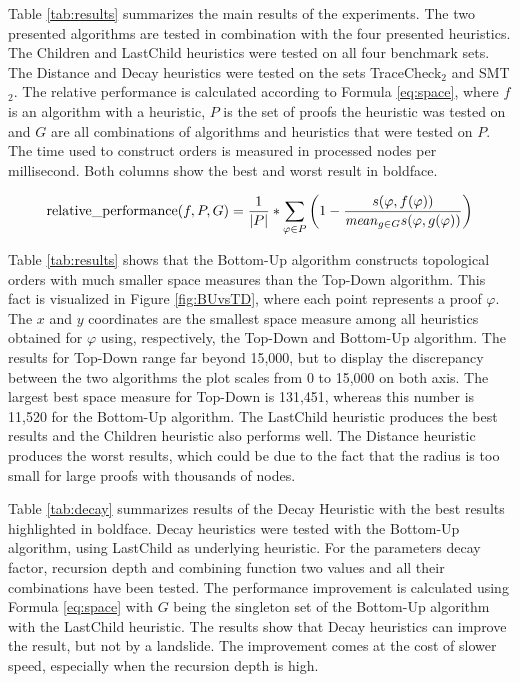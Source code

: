 Table \ref{tab:results} summarizes the main results of the experiments.
The two presented algorithms are tested in combination with the four presented heuristics.
The Children and LastChild heuristics were tested on all four benchmark sets.
The Distance and Decay heuristics were tested on the sets TraceCheck$_2$ and SMT$_2$.
The relative performance is calculated according to Formula \ref{eq:space}, where $f$ is an algorithm with a heuristic, $P$ is the set of proofs the heuristic was tested on and $G$ are all combinations of algorithms and heuristics that were tested on $P$.
The time used to construct orders is measured in processed nodes per millisecond.
Both columns show the best and worst result in boldface.

\begin{align}
  \operatorname{relative\_performance}(f,P,G) = \frac{1}{|P|} * \sum_{\varphi \in P}{\left( 1 -
    \frac{
      s(\varphi,f(\varphi))
    }{
        \mathit{mean}_{g\in G}{s(\varphi,g(\varphi))}
    } \right)
  }
  \label{eq:space}
\end{align}

Table \ref{tab:results} shows that the Bottom-Up algorithm constructs topological orders with much smaller space measures than the Top-Down algorithm. 
This fact is visualized in Figure \ref{fig:BUvsTD}, where each point represents a proof $\varphi$.
The $x$ and $y$ coordinates are the smallest space measure among all heuristics obtained for $\varphi$ using, respectively, the Top-Down and Bottom-Up algorithm.
The results for Top-Down range far beyond 15,000, but to display the discrepancy between the two algorithms the plot scales from 0 to 15,000 on both axis.
The largest best space measure for Top-Down is 131,451, whereas this number is 11,520 for the Bottom-Up algorithm.
The LastChild heuristic produces the best results and the Children heuristic also performs well.
The Distance heuristic produces the worst results, which could be due to the fact that the radius is too small for large proofs with thousands of  nodes.

Table \ref{tab:decay} summarizes results of the Decay Heuristic with the best results highlighted in boldface.
Decay heuristics were tested with the Bottom-Up algorithm, using LastChild as underlying heuristic.
For the parameters decay factor, recursion depth and combining function two values and all their combinations have been tested.
The performance improvement is calculated using Formula \ref{eq:space} with $G$ being the singleton set of the Bottom-Up algorithm with the LastChild heuristic.
The results show that Decay heuristics can improve the result, but not by a landslide.
The improvement comes at the cost of slower speed, especially when the recursion depth is high.

